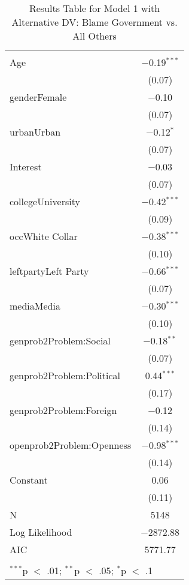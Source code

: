 
\begin{table}[!htbp] \centering 
  \caption{Results Table for Model 1 with Alternative DV: Blame Government vs. All Others} 
  \label{} 
\footnotesize 
\begin{tabular}{@{\extracolsep{5pt}}lc} 
\\[-1.8ex]\hline \\[-1.8ex] 
\hline \\[-1.8ex] 
 Age & $-$0.19$^{***}$ \\ 
  & (0.07) \\ 
  genderFemale & $-$0.10 \\ 
  & (0.07) \\ 
  urbanUrban & $-$0.12$^{*}$ \\ 
  & (0.07) \\ 
  Interest & $-$0.03 \\ 
  & (0.07) \\ 
  collegeUniversity & $-$0.42$^{***}$ \\ 
  & (0.09) \\ 
  occWhite Collar & $-$0.38$^{***}$ \\ 
  & (0.10) \\ 
  leftpartyLeft Party & $-$0.66$^{***}$ \\ 
  & (0.07) \\ 
  mediaMedia & $-$0.30$^{***}$ \\ 
  & (0.10) \\ 
  genprob2Problem:Social & $-$0.18$^{**}$ \\ 
  & (0.07) \\ 
  genprob2Problem:Political & 0.44$^{***}$ \\ 
  & (0.17) \\ 
  genprob2Problem:Foreign & $-$0.12 \\ 
  & (0.14) \\ 
  openprob2Problem:Openness & $-$0.98$^{***}$ \\ 
  & (0.14) \\ 
  Constant & 0.06 \\ 
  & (0.11) \\ 
 N & 5148 \\ 
Log Likelihood & $-$2872.88 \\ 
AIC & 5771.77 \\ 
\hline \\[-1.8ex] 
\multicolumn{2}{l}{$^{***}$p $<$ .01; $^{**}$p $<$ .05; $^{*}$p $<$ .1} \\ 
\end{tabular} 
\end{table} 

